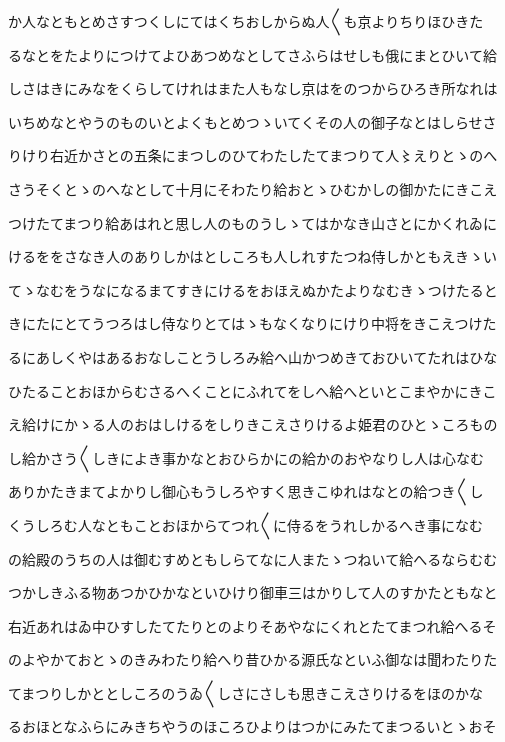 \documentclass[a4paper,11pt,landscape]{ltjtarticle}
\begin{document}
か人なともとめさすつくしにてはくちおしからぬ人〱も京よりちりほひきた
\par\medskip
るなとをたよりにつけてよひあつめなとしてさふらはせしも俄にまとひいて給
\par\medskip
しさはきにみなをくらしてけれはまた人もなし京はをのつからひろき所なれは
\par\medskip
いちめなとやうのものいとよくもとめつゝいてくその人の御子なとはしらせさ
\par\medskip
りけり右近かさとの五条にまつしのひてわたしたてまつりて人〻えりとゝのへ
\par\medskip
さうそくとゝのへなとして十月にそわたり給おとゝひむかしの御かたにきこえ
\par\medskip
つけたてまつり給あはれと思し人のものうしゝてはかなき山さとにかくれゐに
\par\medskip
けるををさなき人のありしかはとしころも人しれすたつね侍しかともえきゝい
\par\medskip
てゝなむをうなになるまてすきにけるをおほえぬかたよりなむきゝつけたると
\par\medskip
きにたにとてうつろはし侍なりとてはゝもなくなりにけり中将をきこえつけた
\par\medskip
るにあしくやはあるおなしことうしろみ給へ山かつめきておひいてたれはひな
\par\medskip
ひたることおほからむさるへくことにふれてをしへ給へといとこまやかにきこ
\par\medskip
え給けにかゝる人のおはしけるをしりきこえさりけるよ姫君のひとゝころもの
\par\medskip
し給かさう〱しきによき事かなとおひらかにの給かのおやなりし人は心なむ
\par\medskip
ありかたきまてよかりし御心もうしろやすく思きこゆれはなとの給つき〱し
\par\medskip
くうしろむ人なともことおほからてつれ〱に侍るをうれしかるへき事になむ
\par\medskip
の給殿のうちの人は御むすめともしらてなに人またゝつねいて給へるならむむ
\par\medskip
つかしきふる物あつかひかなといひけり御車三はかりして人のすかたともなと
\par\medskip
右近あれはゐ中ひすしたてたりとのよりそあやなにくれとたてまつれ給へるそ
\par\medskip
のよやかておとゝのきみわたり給へり昔ひかる源氏なといふ御なは聞わたりた
\par\medskip
てまつりしかととしころのうゐ〱しさにさしも思きこえさりけるをほのかな
\par\medskip
るおほとなふらにみきちやうのほころひよりはつかにみたてまつるいとゝおそ
\end{document}
